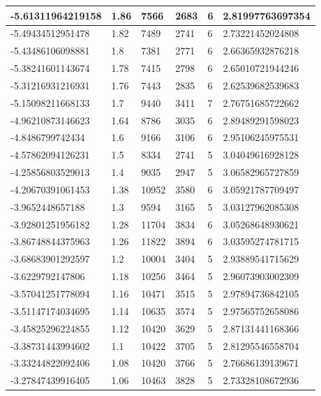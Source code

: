 \documentclass[a4paper]{report}
\numberwithin{equation}{section}
\begin{document}
\begin{table}[!ht]
\begin{tabular}{|l|l|l|l|l|l|}
        -5.61311964219158 & 1.86 & 7566 & 2683 & 6 & 2.81997763697354 \\ \hline
        -5.49434512951478 & 1.82 & 7489 & 2741 & 6 & 2.73221452024808 \\ \hline
        -5.43486106098881 & 1.8 & 7381 & 2771 & 6 & 2.66365932876218 \\ \hline
        -5.38241601143674 & 1.78 & 7415 & 2798 & 6 & 2.65010721944246 \\ \hline
        -5.31216931216931 & 1.76 & 7443 & 2835 & 6 & 2.62539682539683 \\ \hline
        -5.15098211668133 & 1.7 & 9440 & 3411 & 7 & 2.76751685722662 \\ \hline
        -4.96210873146623 & 1.64 & 8786 & 3035 & 6 & 2.89489291598023 \\ \hline
        -4.8486799742434 & 1.6 & 9166 & 3106 & 6 & 2.95106245975531 \\ \hline
        -4.57862094126231 & 1.5 & 8334 & 2741 & 5 & 3.04049616928128 \\ \hline
        -4.25856803529013 & 1.4 & 9035 & 2947 & 5 & 3.06582965727859 \\ \hline
        -4.20670391061453 & 1.38 & 10952 & 3580 & 6 & 3.05921787709497 \\ \hline
        -3.9652448657188 & 1.3 & 9594 & 3165 & 5 & 3.03127962085308 \\ \hline
        -3.92801251956182 & 1.28 & 11704 & 3834 & 6 & 3.05268648930621 \\ \hline
        -3.86748844375963 & 1.26 & 11822 & 3894 & 6 & 3.03595274781715 \\ \hline
        -3.68683901292597 & 1.2 & 10004 & 3404 & 5 & 2.93889541715629 \\ \hline
        -3.6229792147806 & 1.18 & 10256 & 3464 & 5 & 2.96073903002309 \\ \hline
        -3.57041251778094 & 1.16 & 10471 & 3515 & 5 & 2.97894736842105 \\ \hline
        -3.51147174034695 & 1.14 & 10635 & 3574 & 5 & 2.97565752658086 \\ \hline
        -3.45825296224855 & 1.12 & 10420 & 3629 & 5 & 2.87131441168366 \\ \hline
        -3.38731443994602 & 1.1 & 10422 & 3705 & 5 & 2.81295546558704 \\ \hline
        -3.33244822092406 & 1.08 & 10420 & 3766 & 5 & 2.76686139139671 \\ \hline
        -3.27847439916405 & 1.06 & 10463 & 3828 & 5 & 2.73328108672936 \\ \hline

\end{tabular}
\end{table}
\end{document}
